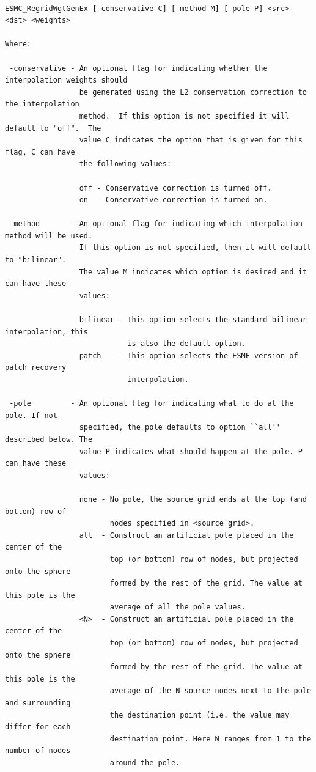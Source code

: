 \begin{verbatim}

ESMC_RegridWgtGenEx [-conservative C] [-method M] [-pole P] <src> <dst> <weights>

Where:

 -conservative - An optional flag for indicating whether the interpolation weights should
                 be generated using the L2 conservation correction to the interpolation
                 method.  If this option is not specified it will default to "off".  The 
                 value C indicates the option that is given for this flag, C can have 
                 the following values:

                 off - Conservative correction is turned off. 
                 on  - Conservative correction is turned on.  

 -method       - An optional flag for indicating which interpolation method will be used.
                 If this option is not specified, then it will default to "bilinear".
                 The value M indicates which option is desired and it can have these 
                 values:

                 bilinear - This option selects the standard bilinear interpolation, this
                            is also the default option.
                 patch    - This option selects the ESMF version of patch recovery 
                            interpolation.

 -pole         - An optional flag for indicating what to do at the pole. If not 
                 specified, the pole defaults to option ``all'' described below. The 
                 value P indicates what should happen at the pole. P can have these 
                 values:

                 none - No pole, the source grid ends at the top (and bottom) row of 
                        nodes specified in <source grid>.
                 all  - Construct an artificial pole placed in the center of the 
                        top (or bottom) row of nodes, but projected onto the sphere 
                        formed by the rest of the grid. The value at this pole is the 
                        average of all the pole values.
                 <N>  - Construct an artificial pole placed in the center of the 
                        top (or bottom) row of nodes, but projected onto the sphere 
                        formed by the rest of the grid. The value at this pole is the 
                        average of the N source nodes next to the pole and surrounding
                        the destination point (i.e. the value may differ for each
                        destination point. Here N ranges from 1 to the number of nodes 
                        around the pole. 
                  

\end{verbatim}
